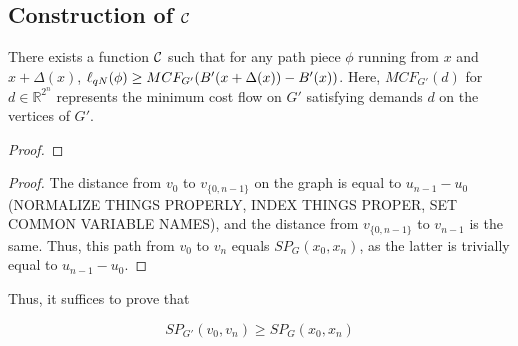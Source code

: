 \subsection{Construction of $\mathcal{C}$}
\begin{lemma}\label{lem:flow} There exists a function $\mathcal{C}$ such that for
any
path piece $\phi$ running from $x$ and $x+\Delta(x)$, $\ell_{qN}(\phi) \geq
MCF_{G'}(B'(x+\Delta(x))-B'(x))$. Here, $MCF_{G'}(d)$ for $d \in
\mathbb{R}^{2^n}$ represents the minimum cost flow on $G'$ satisfying demands
$d$ on the vertices of $G'$.

\end{lemma}

\begin{proof}
\end{proof}

\begin{proof}

The distance from $v_0$ to $v_{\{0,n-1\}}$ on the graph is equal to
$u_{n-1}-u_0$ (NORMALIZE THINGS PROPERLY, INDEX THINGS PROPER, SET COMMON
VARIABLE NAMES), and the distance from $v_{\{0, n-1\}}$ to $v_{n-1}$ is the
same. Thus, this path from $v_0$ to $v_n$ equals $SP_G(x_0, x_n)$, as the
latter is trivially equal to $u_{n-1} - u_0$.

\end{proof}

Thus, it suffices to prove that

\[ SP_{G'}(v_0, v_n) \geq SP_G(x_0, x_n) \]




